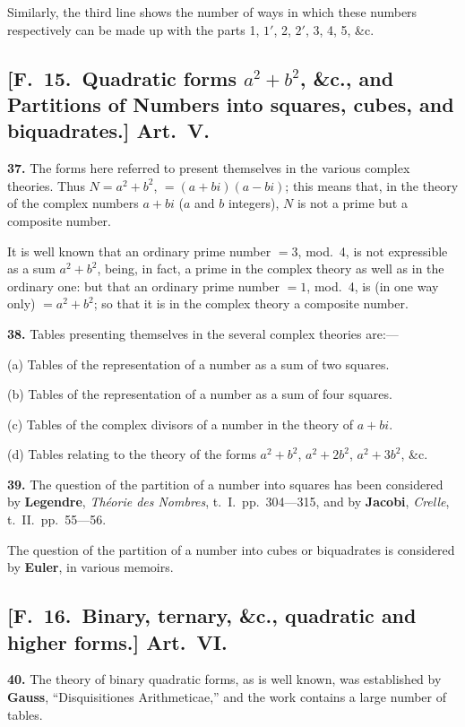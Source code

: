 \documentclass[11pt,a4paper]{book}
\begin{document}
Similarly, the third line shows the number of ways in which these numbers respectively
can be made up with the parts 1, $1'$, 2, $2'$, 3, 4, 5, \&c.

\newpage
\subsection*{[F.\ 15.\ Quadratic forms $a^{2} + b^{2}$, \&c., and Partitions of Numbers into squares, cubes, and biquadrates.] Art.\ V.}

\textbf{37.} The forms here referred to present themselves in the various complex theories.
Thus $N = a^{2} + b^{2}$, $= (a+bi)(a-bi)$; this means that, in the theory of the complex
numbers $a + bi$ ($a$ and $b$ integers), $N$ is not a prime but a composite number.

It is well known that an ordinary prime number $= 3$, mod.\ 4, is not expressible as a sum
$a^{2} + b^{2}$, being, in fact, a prime in the complex theory as well as in the ordinary one:
but that an ordinary prime number $= 1$, mod.\ 4, is (in one way only) $= a^{2} + b^{2}$;
so that it is in the complex theory a composite number.

\textbf{38.} Tables presenting themselves in the several complex theories are:---

\quad(a) Tables of the representation of a number as a sum of two squares.

\quad(b) Tables of the representation of a number as a sum of four squares.

\quad(c) Tables of the complex divisors of a number in the theory of $a + bi$.

\quad(d) Tables relating to the theory of the forms $a^{2} + b^{2}$, $a^{2} + 2b^{2}$, $a^{2} + 3b^{2}$, \&c.

\textbf{39.} The question of the partition of a number into squares has been considered by
\quad\textbf{Legendre}, \textit{Th\' eorie des Nombres}, t.\ I.\ pp.\ 304---315,
and by
\quad\textbf{Jacobi}, \textit{Crelle}, t.\ II.\ pp.\ 55---56.

The question of the partition of a number into cubes or biquadrates is considered by
\quad\textbf{Euler}, in various memoirs.


\newpage
\subsection*{[F.\ 16.\ Binary, ternary, \&c., quadratic and higher forms.] Art.\ VI.}

\textbf{40.} The theory of binary quadratic forms, as is well known, was established by
\quad\textbf{Gauss}, ``Disquisitiones Arithmeticae,'' and the work contains a large number of tables.
\end{document}
